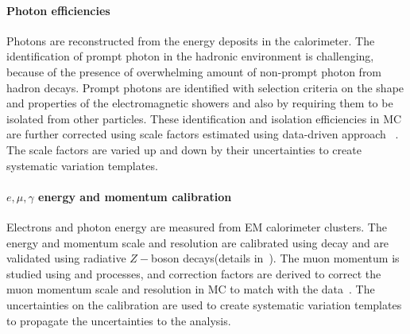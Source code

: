 \paragraph{Photon efficiencies}
Photons are reconstructed from the energy deposits in the calorimeter. The identification of prompt photon in the hadronic environment is challenging, because of the presence of overwhelming amount of  non-prompt photon from hadron decays. Prompt photons are identified with selection criteria on the shape and properties of the electromagnetic showers and also by requiring them to be isolated from other particles. These identification and isolation efficiencies in MC are further corrected using scale factors estimated using data-driven approach ~\cite{ATLAS:2016ecu,ATLAS:2019qmc}. The scale factors are varied up and down by their uncertainties to create systematic variation templates. 

\paragraph{$e,\mu,\gamma$ energy and momentum calibration}
Electrons and photon energy are measured from EM calorimeter clusters. The energy and momentum scale and resolution are calibrated using \zee decay and are validated using radiative $Z-$boson decays(details in~\cite{ATLAS:2019qmc}). The muon momentum is studied using \zmumu and \jpsimumu processes, and correction factors are derived to correct the muon momentum scale and resolution in MC to match with the data~\cite{ATLAS:2016lqx}. The uncertainties on the calibration are used to create systematic variation templates to propagate the uncertainties to the analysis.


